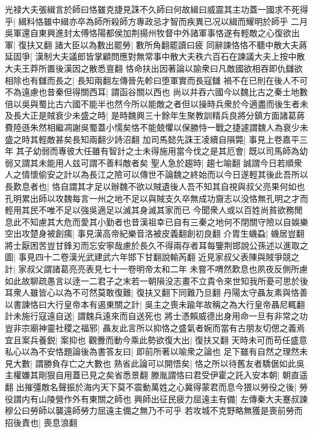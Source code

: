 光禄大夫張緝言於師曰恪雖克捷見誅不久師曰何故緝曰威震其主功蓋一國求不死得乎|{
	緝料恪雖中緝亦卒為師所殺師方專政忌才智而疾異已况以緝而耀明於師乎}
二月吳軍還自東興進封太傅恪陽都侯加荆揚州牧督中外諸軍事恪遂有輕敵之心復欲出軍|{
	復扶又翻}
諸大臣以為數出罷勞|{
	數所角翻罷讀曰疲}
同辭諫恪恪不聽中散大夫蔣延固爭|{
	漢制大夫議郎皆掌顧問應對無常事中散大夫秩六百石在諫議大夫上按中散大夫王莽所置後漢因之散悉亶翻}
恪命扶出因著論以諭衆曰凡敵國欲相吞即仇讎欲相除也有讎而長之|{
	長知兩翻左傳晉先軫曰堕軍實而長寇讎}
禍不在已則在後人不可不為遠慮也昔秦但得關西耳|{
	謂函谷關以西也}
尚以并吞六國今以魏比古之秦土地數倍以吳與蜀比古六國不能半也然今所以能敵之者但以操時兵衆於今適盡而後生者未及長大正是賊衰少未盛之時|{
	是時魏興三十餘年生聚教訓精兵良將分鎮方面諸葛蔣費陸遜朱然相繼凋謝吳蜀蓋小懦矣恪不能兢懼以保勝恃一戰之捷遽謂魏人為衰少未盛之時其輕敵甚矣長知兩翻少詩沼翻}
加司馬懿先誅王凌續自隕斃|{
	事見上卷嘉平三年}
其子幼弱而專彼大任雖有智計之士未得施用當今伐之是其厄會|{
	既以司馬師為幼弱又謂其未能用人兹可謂不善料敵者矣}
聖人急於趨時|{
	趨七喻翻}
誠謂今日若順衆人之情懷偷安之計以為長江之險可以傳世不論魏之終始而以今日遂輕其後此吾所以長歎息者也|{
	恪自謂其才足以辦魏不欲以賊遺後人吾不知其自視與叔父亮果何如也孔明累出師以攻魏每言一州之地不足以與賊支久卒無成功齎志以没恪無孔明之才而輕用其民不唯不足以強吳適足以滅其身滅其家而已}
今聞衆人或以百姓尚貧欲務閒息此不知慮其大危而愛其小勤者也昔漢祖幸已自有三秦之地何不閉關守險以自娛樂空出攻楚身被創痍|{
	事見漢高帝紀樂音洛被皮義翻創初良翻}
介胄生蟣蝨|{
	蟣居豈翻}
將士厭困苦豈甘鋒刃而忘安寧哉慮於長久不得兩存者耳每鑒荆邯說公孫述以進取之圖|{
	事見四十二卷漢光武建武六年邯下甘翻說輸芮翻}
近見家叔父表陳與賊爭競之計|{
	家叔父謂諸葛亮亮表見七十一卷明帝太和二年}
未嘗不喟然歎息也夙夜反側所慮如此故聊疏愚言以逹一二君子之末若一朝隕没志畫不立貴令來世知我所憂可思於後耳衆人雖皆心以為不可然莫敢復難|{
	復扶又翻下同難乃旦翻}
丹陽太守聶友素與恪善以書諫恪曰大行皇帝本有遏東關之計|{
	吳主之喪未踰年故稱之為大行皇帝聶尼輒翻}
計未施行寇遠自送|{
	謂魏兵遠來而自送死也}
將士憑賴威德出身用命一旦有非常之功豈非宗廟神靈社稷之福邪|{
	聶友此言所以抑恪之盛氣者婉而當有古朋友切偲之義焉}
宜且案兵養鋭|{
	案抑也}
觀釁而動今乘此勢欲復大出|{
	復扶又翻}
天時未可而苟任盛意私心以為不安恪題論後為書答友曰|{
	即前所著以喻衆之論也}
足下雖有自然之理然未見大數|{
	謂勝負存亡之大數也}
熟省此論可以開悟矣|{
	恪之所以待舊友者驕倨如此吳主權嫌其剛狠自用蓋已見之矣省悉景翻}
滕胤謂恪曰君受伊霍之託入安本朝|{
	朝直遥翻}
出摧彊敵名聲振於海内天下莫不震動萬姓之心冀得蒙君而息今猥以勞役之後|{
	勞役謂内有山陵營作外有東關之師也}
興師出征民疲力屈遠主有備|{
	左傳秦大夫蹇叔諫穆公曰勞師以襲遠師勞力屈遠主備之無乃不可乎}
若攻城不克野略無獲是喪前勞而招後責也|{
	喪息浪翻}
